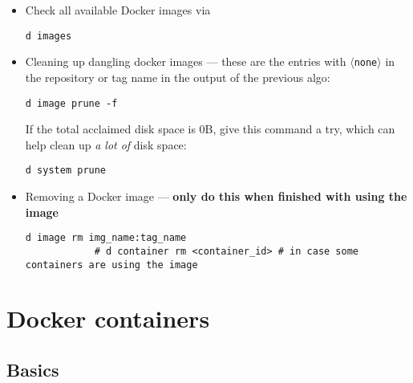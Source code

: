 \documentclass[12pt, a4paper]{scrbook}
\numberwithin{equation}{section}
\theoremstyle{definition}
\theoremstyle{definition}
\begin{document}
	\begin{itemize}
		
		\item Check all available Docker images via
		
		\begin{lstlisting}[style=mystylebash, label=alg:docker__check_avail_imgs, xleftmargin=\parindent]
			d images
		\end{lstlisting}
		
		\item Cleaning up dangling docker images --- these are the entries with $\langle$\texttt{none}$\rangle$ in the repository or tag name in the output of the previous algo:
		
		\begin{lstlisting}[style=mystylebash, label=alg:docker_rm__dangling, xleftmargin=\parindent]
			d image prune -f
		\end{lstlisting}
	
		If the total acclaimed disk space is $0$B, give this command a try, which can help clean up \textit{a lot of} disk space:
		\begin{lstlisting}[style=mystylebash, label=alg:docker_system_prune, xleftmargin=\parindent]
			d system prune
		\end{lstlisting}
		
		\item Removing a Docker image --- \textbf{only do this when finished with using the image}
		
		\begin{lstlisting}[style=mystylebash, label=alg:docker_remove, xleftmargin=\parindent]
			d image rm img_name:tag_name
			# d container rm <container_id> # in case some containers are using the image
		\end{lstlisting}
		
	\end{itemize}
	
	\section{Docker containers}
	
	\subsection{Basics}
	
\end{document}
